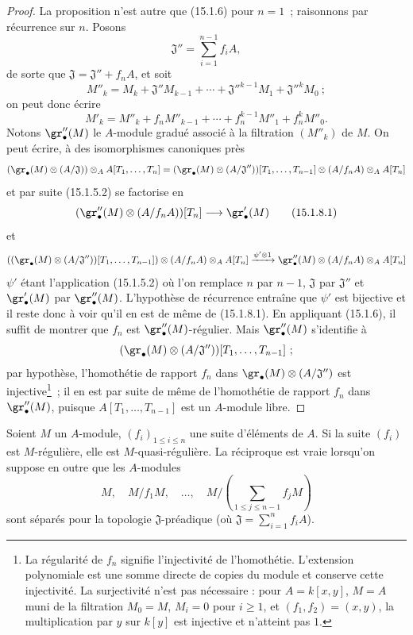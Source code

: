 \begin{proof}
La proposition n'est autre que (15.1.6) pour $n=1$~; raisonnons par récurrence
sur $n$. Posons
\[
  \mathfrak{J}''=\sum_{i=1}^{n-1}f_iA,
\]
de sorte que $\mathfrak{J}=\mathfrak{J}''+f_nA$, et soit
\[
  M''_k=M_k+\mathfrak{J}''M_{k-1}+\cdots+
  \mathfrak{J}''^{k-1}M_1+\mathfrak{J}''^kM_0~;
\]
on peut donc écrire
\[
  M'_k=M''_k+f_nM''_{k-1}+\cdots+f_n^{k-1}M''_1+f_n^kM''_0.
\]
Notons $\gr''_\bullet(M)$ le $A$-module gradué associé à la filtration
$(M''_k)$ de $M$. On peut écrire, à des isomorphismes canoniques près
\[
  (\gr_\bullet(M)\otimes(A/\mathfrak{J}))\otimes_A A[T_1,\ldots,T_n]
  =
  (\gr_\bullet(M)\otimes(A/\mathfrak{J}''))[T_1,\ldots,T_{n-1}]
  \otimes(A/f_nA)\otimes_A A[T_n]
\]
et par suite (15.1.5.2) se factorise en
\[
  (\gr''_\bullet(M)\otimes(A/f_nA))[T_n]\longrightarrow\gr'_\bullet(M)
  \tag{15.1.8.1}\label{0.15.1.8.1-fr}
\]
et
\[
  ((\gr_\bullet(M)\otimes(A/\mathfrak{J}''))[T_1,\ldots,T_{n-1}])
  \otimes(A/f_nA)\otimes_A A[T_n]
  \xrightarrow{\psi'\otimes1}
  \gr''_\bullet(M)\otimes(A/f_nA)\otimes_A A[T_n]
\]
$\psi'$ étant l'application (15.1.5.2) où l'on remplace $n$ par $n-1$,
$\mathfrak{J}$ par $\mathfrak{J}''$ et $\gr'_\bullet(M)$ par
$\gr''_\bullet(M)$. L'hypothèse de récurrence entraîne que $\psi'$ est
bijective et il reste donc à voir qu'il en est de même de (15.1.8.1). En
appliquant (15.1.6), il suffit de montrer que $f_n$ est
$\gr''_\bullet(M)$-régulier. Mais $\gr''_\bullet(M)$ s'identifie à
\[
  (\gr_\bullet(M)\otimes(A/\mathfrak{J}''))
  [T_1,\ldots,T_{n-1}]~;
\]
par hypothèse, l'homothétie de rapport $f_n$ dans
$\gr_\bullet(M)\otimes(A/\mathfrak{J}'')$ est injective\footnote{La régularité de $f_n$ signifie l'injectivité de l'homothétie. L'extension polynomiale est une somme directe de copies du module et conserve cette injectivité. La surjectivité n'est pas nécessaire : pour $A=k[x,y]$, $M=A$ muni de la filtration $M_0=M$, $M_i=0$ pour $i\geq1$, et $(f_1,f_2)=(x,y)$, la multiplication par $y$ sur $k[y]$ est injective et n'atteint pas $1$.}~; il en est par suite
de même de l'homothétie de rapport $f_n$ dans $\gr''_\bullet(M)$, puisque
$A[T_1,\ldots,T_{n-1}]$ est un $A$-module libre.
\end{proof}

\begin{proposition}[15.1.9]
\label{0.15.1.9-fr}
Soient $M$ un $A$-module, $(f_i)_{1\leq i\leq n}$ une suite d'éléments de $A$.
Si la suite $(f_i)$ est $M$-régulière, elle est $M$-quasi-régulière. La
réciproque est vraie lorsqu'on suppose en outre que les $A$-modules
\[
  M,\quad M/f_1M,\quad\ldots,\quad
  M/\left(\sum_{1\leq j\leq n-1}f_jM\right)
\]
sont séparés pour la topologie $\mathfrak{J}$-préadique (où
$\mathfrak{J}=\sum_{i=1}^n f_iA$).
\end{proposition}

